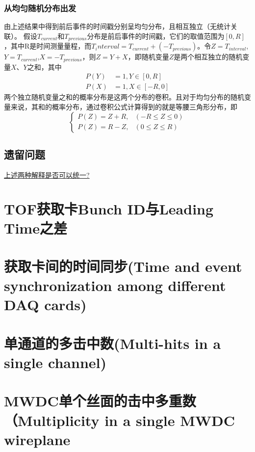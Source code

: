 \subsubsection*{从均匀随机分布出发}
由上述结果中得到前后事件的时间戳分别呈均匀分布，且相互独立（无统计关联）。
假设$T_{current}$和$T_{previous}$分布是前后事件的时间戳，它们的取值范围为$[0,R]$，其中R是时间测量量程，而${T_interval=T_{current}+(-T_{previous})}$。令$Z=T_{interval}$,$Y=T_{current}$,$X=-T_{previous}$，则$Z=Y+X$，即随机变量$Z$是两个相互独立的随机变量$X、Y$之和，其中
\begin{align}
P(Y)&=1, Y\in [0,R]\\
P(X)&=1, X\in [-R,0]
\end{align}
两个独立随机变量之和的概率分布是这两个分布的卷积。且对于均匀分布的随机变量来说，其和的概率分布，通过卷积公式计算得到的就是等腰三角形分布，即
\begin{equation}
	\begin{cases}
	P(Z)=Z+R,&(-R\leq Z \leq 0)\\
	P(Z)=R-Z,&(0\leq Z \leq R)
	\end{cases}
\end{equation}

\subsection{遗留问题}
\underline{上述两种解释是否可以统一?}

\section{TOF获取卡Bunch ID与Leading Time之差}

\section{获取卡间的时间同步(Time and event synchronization among different DAQ cards)}

\section{单通道的多击中数(Multi-hits in a single channel)}

\section{MWDC单个丝面的击中多重数（Multiplicity in a single MWDC wireplane}